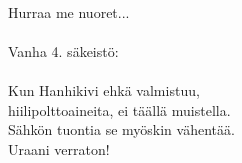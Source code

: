 \hspace{10mm} \\
            Hurraa me nuoret... \\
\hspace{10mm} \\
            Vanha 4. säkeistö: \\
\hspace{10mm} \\
            Kun Hanhikivi ehkä valmistuu, \\
            hiilipolttoaineita, ei täällä muistella. \\
            Sähkön tuontia se myöskin vähentää. \\
            Uraani verraton! \\

